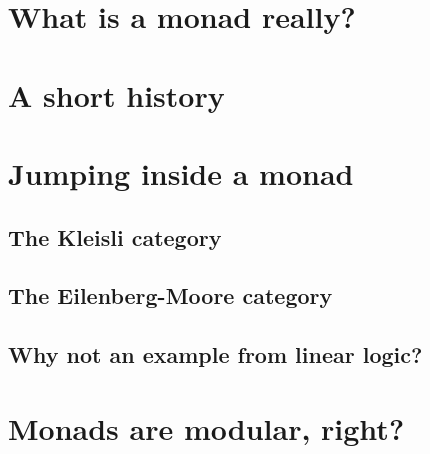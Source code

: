 \documentclass{article}
\begin{document}
\section{What is a monad really?}
\label{sec:what_is_a_monad_really}


\section{A short history}
\label{sec:a_short_history}
\cite{Moggi:1988}

\section{Jumping inside a monad}
\label{sec:jumping_inside_a_monad}
\subsection{The Kleisli category}
\label{subsec:the_kleisli_category}


\subsection{The Eilenberg-Moore category}
\label{subsec:the_eilenberg-moore_category}


\subsection{Why not an example from linear logic?}
\label{subsec:why_not_an_example_from_linear_logic}


\section{Monads are modular, right?}
\label{sec:monads_are_modular,_right?}





\end{document}
